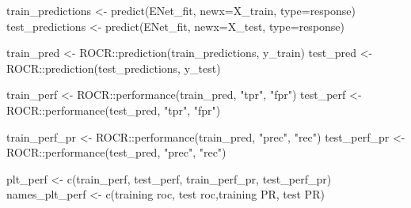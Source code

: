 \documentclass[
  letterpaper,
  DIV=11,
  numbers=noendperiod]{scrartcl}
\newenvironment{Shaded}{\begin{snugshade}}{\end{snugshade}}
\newcommand{\AttributeTok}[1]{\textcolor[rgb]{0.40,0.45,0.13}{#1}}
\newcommand{\FunctionTok}[1]{\textcolor[rgb]{0.28,0.35,0.67}{#1}}
\newcommand{\NormalTok}[1]{\textcolor[rgb]{0.00,0.23,0.31}{#1}}
\newcommand{\OtherTok}[1]{\textcolor[rgb]{0.00,0.23,0.31}{#1}}
\newcommand{\SpecialCharTok}[1]{\textcolor[rgb]{0.37,0.37,0.37}{#1}}
\newcommand{\StringTok}[1]{\textcolor[rgb]{0.13,0.47,0.30}{#1}}
\begin{document}
\begin{Shaded}
\begin{Highlighting}[]
\NormalTok{train\_predictions }\OtherTok{\textless{}{-}} \FunctionTok{predict}\NormalTok{(ENet\_fit, }\AttributeTok{newx=}\NormalTok{X\_train, }\AttributeTok{type=}\StringTok{\textquotesingle{}response\textquotesingle{}}\NormalTok{)}
\NormalTok{test\_predictions }\OtherTok{\textless{}{-}} \FunctionTok{predict}\NormalTok{(ENet\_fit, }\AttributeTok{newx=}\NormalTok{X\_test, }\AttributeTok{type=}\StringTok{\textquotesingle{}response\textquotesingle{}}\NormalTok{)}

\NormalTok{train\_pred }\OtherTok{\textless{}{-}}\NormalTok{ ROCR}\SpecialCharTok{::}\FunctionTok{prediction}\NormalTok{(train\_predictions, y\_train)}
\NormalTok{test\_pred }\OtherTok{\textless{}{-}}\NormalTok{ ROCR}\SpecialCharTok{::}\FunctionTok{prediction}\NormalTok{(test\_predictions, y\_test)}

\NormalTok{train\_perf }\OtherTok{\textless{}{-}}\NormalTok{ ROCR}\SpecialCharTok{::}\FunctionTok{performance}\NormalTok{(train\_pred, }\StringTok{"tpr"}\NormalTok{, }\StringTok{"fpr"}\NormalTok{)}
\NormalTok{test\_perf }\OtherTok{\textless{}{-}}\NormalTok{ ROCR}\SpecialCharTok{::}\FunctionTok{performance}\NormalTok{(test\_pred, }\StringTok{"tpr"}\NormalTok{, }\StringTok{"fpr"}\NormalTok{)}

\NormalTok{train\_perf\_pr }\OtherTok{\textless{}{-}}\NormalTok{ ROCR}\SpecialCharTok{::}\FunctionTok{performance}\NormalTok{(train\_pred, }\StringTok{"prec"}\NormalTok{, }\StringTok{"rec"}\NormalTok{)}
\NormalTok{test\_perf\_pr }\OtherTok{\textless{}{-}}\NormalTok{ ROCR}\SpecialCharTok{::}\FunctionTok{performance}\NormalTok{(test\_pred, }\StringTok{"prec"}\NormalTok{, }\StringTok{"rec"}\NormalTok{)}
\end{Highlighting}
\end{Shaded}

\begin{Shaded}
\begin{Highlighting}[]
\NormalTok{plt\_perf }\OtherTok{\textless{}{-}} \FunctionTok{c}\NormalTok{(train\_perf, test\_perf, train\_perf\_pr, test\_perf\_pr)}
\NormalTok{names\_plt\_perf }\OtherTok{\textless{}{-}} \FunctionTok{c}\NormalTok{(}\StringTok{\textquotesingle{}training roc\textquotesingle{}}\NormalTok{, }\StringTok{\textquotesingle{}test roc\textquotesingle{}}\NormalTok{,}\StringTok{\textquotesingle{}training PR\textquotesingle{}}\NormalTok{, }\StringTok{\textquotesingle{}test PR\textquotesingle{}}\NormalTok{)}
\end{Highlighting}
\end{Shaded}
\end{document}
